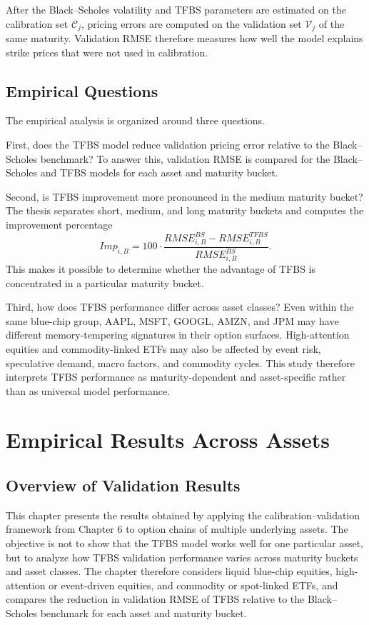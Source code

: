 \documentclass[11pt,a4paper]{report}
\begin{document}
After the Black--Scholes volatility and TFBS parameters are estimated on the calibration set $\mathcal{C}_j$, pricing errors are computed on the validation set $\mathcal{V}_j$ of the same maturity. Validation RMSE therefore measures how well the model explains strike prices that were not used in calibration.

\section{Empirical Questions}

The empirical analysis is organized around three questions.

First, does the TFBS model reduce validation pricing error relative to the Black--Scholes benchmark? To answer this, validation RMSE is compared for the Black--Scholes and TFBS models for each asset and maturity bucket.

Second, is TFBS improvement more pronounced in the medium maturity bucket? The thesis separates short, medium, and long maturity buckets and computes the improvement percentage
\[
Imp_{i,B}
=
100
\cdot
\frac{
RMSE_{i,B}^{BS}
-
RMSE_{i,B}^{TFBS}
}{
RMSE_{i,B}^{BS}
}.
\]
This makes it possible to determine whether the advantage of TFBS is concentrated in a particular maturity bucket.

Third, how does TFBS performance differ across asset classes? Even within the same blue-chip group, AAPL, MSFT, GOOGL, AMZN, and JPM may have different memory-tempering signatures in their option surfaces. High-attention equities and commodity-linked ETFs may also be affected by event risk, speculative demand, macro factors, and commodity cycles. This study therefore interprets TFBS performance as maturity-dependent and asset-specific rather than as universal model performance.

\chapter{Empirical Results Across Assets}

\section{Overview of Validation Results}

This chapter presents the results obtained by applying the calibration--validation framework from Chapter 6 to option chains of multiple underlying assets. The objective is not to show that the TFBS model works well for one particular asset, but to analyze how TFBS validation performance varies across maturity buckets and asset classes. The chapter therefore considers liquid blue-chip equities, high-attention or event-driven equities, and commodity or spot-linked ETFs, and compares the reduction in validation RMSE of TFBS relative to the Black--Scholes benchmark for each asset and maturity bucket.
\end{document}
